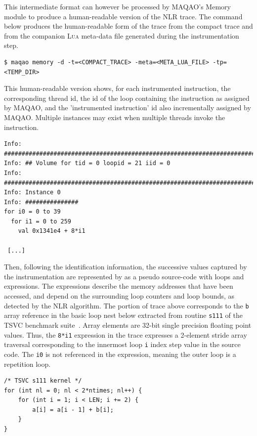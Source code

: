 \documentclass[11pt, a4paper, twoside]{montblanc2}
\def\lua{\textsc{Lua}\xspace}
\begin{document}
This intermediate format can however be processed by MAQAO's Memory module to 
produce a human-readable version of the NLR trace. The command below produces
the human-readable form of the trace from the compact trace and from the companion
\lua meta-data file generated during the instrumentation step.
 
\begin{verbatim}
$ maqao memory -d -t=<COMPACT_TRACE> -meta=<META_LUA_FILE> -tp=<TEMP_DIR>
\end{verbatim}

 This human-readable version shows, for each instrumented instruction, the
 corresponding thread id, the id of the loop containing the instruction as
 assigned by MAQAO, and the 'instrumented instruction' id also incrementally
 assigned by MAQAO. Multiple instances may exist when multiple threads invoke
 the instruction.

\begin{footnotesize}
\begin{verbatim}
Info: ################################################################################
Info: ## Volume for tid = 0 loopid = 21 iid = 0
Info: ################################################################################
Info: Instance 0
Info: ###############
for i0 = 0 to 39
  for i1 = 0 to 259
    val 0x1341e4 + 8*i1

 [...]
\end{verbatim}
\end{footnotesize}

Then, following the identification information, the successive values captured
by the instrumentation are represented by as a pseudo source-code with loops and
expressions. The expressions describe the memory addresses that have been
accessed, and depend on the surrounding loop counters and loop bounds, as
detected by the NLR algorithm. The portion of trace above corresponds to the
\texttt{b} array reference in the basic loop nest below extracted from routine
\texttt{s111} of the TSVC benchmark
suite~\cite{maleki:vectorization:pact:2011,callahan:tsvc:sc:1988}. Array
elements are 32-bit single precision floating point values. Thus, the
\texttt{8*i1} expression in the trace expresses a 2-element stride array
traversal corresponding to the innermost loop \texttt{i} index step value in the
source code. The \texttt{i0} is not referenced in the expression, meaning the
outer loop is a repetition loop.

\begin{lstlisting}
/* TSVC s111 kernel */
for (int nl = 0; nl < 2*ntimes; nl++) {
	for (int i = 1; i < LEN; i += 2) {
		a[i] = a[i - 1] + b[i];
	}
}
\end{lstlisting}
\end{document}
